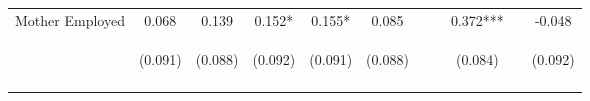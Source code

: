 \begin{tabular}{lcccccccccc}
\noalign{\smallskip}Mother Employed & 0.068 & 0.139 & 0.152* & 0.155* & 0.085 &  &  & 0.372*** &  & -0.048\\
 & \begin{footnotesize}(0.091)\end{footnotesize} & \begin{footnotesize}(0.088)\end{footnotesize} & \begin{footnotesize}(0.092)\end{footnotesize} & \begin{footnotesize}(0.091)\end{footnotesize} & \begin{footnotesize}(0.088)\end{footnotesize} & \begin{footnotesize}\end{footnotesize} & \begin{footnotesize}\end{footnotesize} & \begin{footnotesize}(0.084)\end{footnotesize} & \begin{footnotesize}\end{footnotesize} & \begin{footnotesize}(0.092)\end{footnotesize}\\
\noalign{\smallskip}\hline\end{tabular}\\
